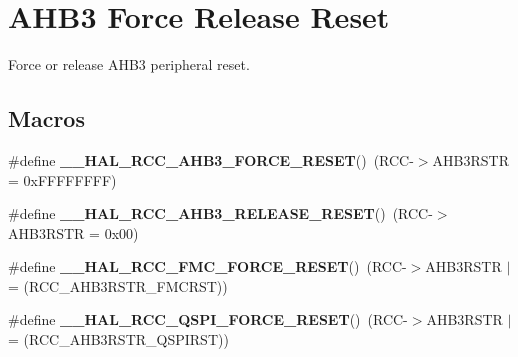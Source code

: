 \hypertarget{group___r_c_c_ex___a_h_b3___force___release___reset}{}\section{A\+H\+B3 Force Release Reset}
\label{group___r_c_c_ex___a_h_b3___force___release___reset}


Force or release A\+H\+B3 peripheral reset.  


\subsection*{Macros}
\begin{DoxyCompactItemize}
\item 
\#define {\bfseries \+\_\+\+\_\+\+H\+A\+L\+\_\+\+R\+C\+C\+\_\+\+A\+H\+B3\+\_\+\+F\+O\+R\+C\+E\+\_\+\+R\+E\+S\+ET}()~(R\+CC-\/$>$A\+H\+B3\+R\+S\+TR = 0x\+F\+F\+F\+F\+F\+F\+F\+F)\hypertarget{group___r_c_c_ex___a_h_b3___force___release___reset_ga230a57ed6c129076b4fd17bdb07d79f6}{}\label{group___r_c_c_ex___a_h_b3___force___release___reset_ga230a57ed6c129076b4fd17bdb07d79f6}

\item 
\#define {\bfseries \+\_\+\+\_\+\+H\+A\+L\+\_\+\+R\+C\+C\+\_\+\+A\+H\+B3\+\_\+\+R\+E\+L\+E\+A\+S\+E\+\_\+\+R\+E\+S\+ET}()~(R\+CC-\/$>$A\+H\+B3\+R\+S\+TR = 0x00)\hypertarget{group___r_c_c_ex___a_h_b3___force___release___reset_ga200c904f6644fc13da81eed085bc6850}{}\label{group___r_c_c_ex___a_h_b3___force___release___reset_ga200c904f6644fc13da81eed085bc6850}

\item 
\#define {\bfseries \+\_\+\+\_\+\+H\+A\+L\+\_\+\+R\+C\+C\+\_\+\+F\+M\+C\+\_\+\+F\+O\+R\+C\+E\+\_\+\+R\+E\+S\+ET}()~(R\+CC-\/$>$A\+H\+B3\+R\+S\+TR $\vert$= (R\+C\+C\+\_\+\+A\+H\+B3\+R\+S\+T\+R\+\_\+\+F\+M\+C\+R\+ST))\hypertarget{group___r_c_c_ex___a_h_b3___force___release___reset_gacc5e9454e3e387166d5caf94e91dfdf2}{}\label{group___r_c_c_ex___a_h_b3___force___release___reset_gacc5e9454e3e387166d5caf94e91dfdf2}

\item 
\#define {\bfseries \+\_\+\+\_\+\+H\+A\+L\+\_\+\+R\+C\+C\+\_\+\+Q\+S\+P\+I\+\_\+\+F\+O\+R\+C\+E\+\_\+\+R\+E\+S\+ET}()~(R\+CC-\/$>$A\+H\+B3\+R\+S\+TR $\vert$= (R\+C\+C\+\_\+\+A\+H\+B3\+R\+S\+T\+R\+\_\+\+Q\+S\+P\+I\+R\+ST))\hypertarget{group___r_c_c_ex___a_h_b3___force___release___reset_ga74a4afc21ca89d872351c19d2dee2f4d}{}\label{group___r_c_c_ex___a_h_b3___force___release___reset_ga74a4afc21ca89d872351c19d2dee2f4d}


\end{DoxyCompactItemize}

